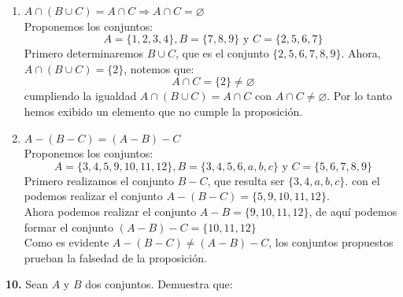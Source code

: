 \documentclass[12pt]{article}
\begin{document}
\begin{enumerate}[label=\alph*)]
    \item $A \cap (B \cup C) = A \cap C \Longrightarrow A \cap C = \varnothing$\\

    Proponemos los conjuntos:
    \[A = \{1, 2, 3, 4\}, B = \{7, 8, 9\} \text{ y } C = \{2, 5, 6, 7\}\]
    Primero determinaremos $B \cup C$, que es el conjunto $\{2, 5, 6, 7, 8, 9\}$. Ahora, $A \cap (B \cup C) = \{2\}$, notemos que:
    \[A \cap C = \{2\} \neq \varnothing\]
    cumpliendo la igualdad $A \cap (B \cup C) = A \cap C$ con $A \cap C \neq \varnothing$. Por lo tanto hemos exibido un elemento 
    que no cumple la proposición.

    \item $A - (B - C) = (A - B) - C$\\

    Proponemos los conjuntos:
    \[A = \{3, 4, 5, 9, 10, 11, 12\}, B = \{3, 4, 5, 6, a, b, c\} \text{ y } C = \{5, 6, 7, 8, 9\}\]
    Primero realizamos el conjunto $B - C$, que resulta ser $\{3, 4, a, b, c\}$. con el podemos realizar 
    el conjunto $ A - (B - C) = \{5, 9, 10, 11, 12\}$.\\

    Ahora podemos realizar el conjunto $A - B = \{9, 10, 11, 12\}$, de aquí podemos formar el 
    conjunto $(A - B) - C = \{10, 11, 12\}$\\

    Como es evidente $A - (B - C) \neq (A - B) - C$, los conjuntos propuestos prueban la falsedad de la proposición.
\end{enumerate}

%
%
\textbf{10.} Sean $A$ y $B$ dos conjuntos. Demuestra que:
\end{document}
